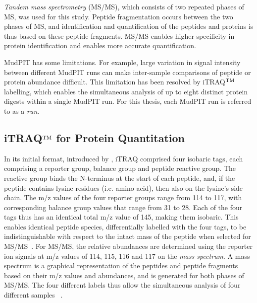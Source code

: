 \documentclass[11pt,a4paper]{article}
\begin{document}
\emph{Tandem mass spectrometry} (MS/MS), which consists of two repeated phases of MS, was used for this study. Peptide fragmentation occurs between the two phases of MS, and identification and quantification of the peptides and proteins is thus based on these peptide fragments. MS/MS enables higher specificity in protein identification and enables more accurate quantification.

MudPIT has some limitations. For example, large variation in signal intensity between different MudPIT runs can make inter-sample comparisons of peptide or protein abundance difficult. This limitation has been resolved by iTRAQ$^{\rm TM}$ labelling, which enables the simultaneous analysis of up to eight distinct protein digests within a single MudPIT run. For this thesis, each MudPIT run is referred to as a \emph{run}. 

\subsection{iTRAQ$^{\rm TM}$ for Protein Quantitation}\label{subsec:iTRAQ}
In its initial format, introduced by \cite{Ross2004}, iTRAQ comprised four isobaric tags, each comprising a reporter group, balance group and peptide reactive group. The reactive group binds the N-terminus at the start of each peptide, and, if the peptide contains lysine residues (i.e. amino acid), then also on the lysine's side chain. The m/z values of the four reporter groups range from 114 to 117, with corresponding balance group values that range from 31 to 28. Each of the four tags thus has an identical total m/z value of 145, making them isobaric. This enables identical peptide species, differentially labelled with the four tags, to be indistinguishable with respect to the intact mass of the peptide when selected for MS/MS~\citep{Ross2004}. For MS/MS, the relative abundances are determined using the reporter ion signals at m/z values of 114, 115, 116 and 117 on the \emph{mass spectrum}. A mass spectrum is a graphical representation of the peptides and peptide fragments based on their m/z values and abundances, and is generated for both phases of MS/MS. The four different labels thus allow the simultaneous analysis of four different samples ~\citep{Ross2004}.
 
\end{document}
